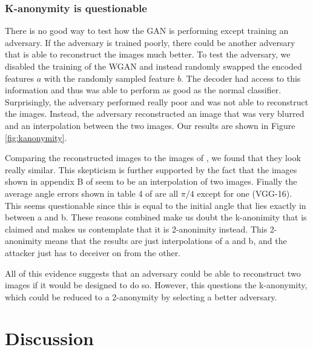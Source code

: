 \subsubsection{K-anonymity is questionable}
There is no good way to test how the GAN is performing except training an adversary. If the adversary is trained poorly, there could be another adversary that is able to reconstruct the images much better.
To test the adversary, we disabled the training of the WGAN and instead randomly swapped the encoded features $a$ with the randomly sampled feature $b$. The decoder had access to this information and thus was able to perform as good as the normal classifier. Surprisingly, the adversary performed really poor and was not able to reconstruct the images. Instead, the adversary reconstructed an image that was very blurred and an interpolation between the two images. Our results are shown in Figure \ref{fig:kanonymity}.

Comparing the reconstructed images to the images of \cite{xiang2020interpretable}, we found that they look really similar.
This skepticism is further supported by the fact that the images shown in appendix B of \cite{xiang2020interpretable} seem to be an interpolation of two images. Finally the average angle errors shown in table 4 of \cite{xiang2020interpretable} are all $\pi/4$ except for one (VGG-16). This seems questionable since this is equal to the initial angle that lies exactly in between a and b. These reasons combined make us doubt the k-anonimity that is claimed and makes us contemplate that it is 2-anonimity instead. This 2-anonimity means that the results are just interpolations of a and b, and the attacker just has to deceiver on from the other.

All of this evidence suggests that an adversary could be able to reconstruct two images if it would be designed to do so. However, this questions the k-anonymity, which could be reduced to a 2-anonymity by selecting a better adversary.



\section{Discussion}\label{Discussion}


